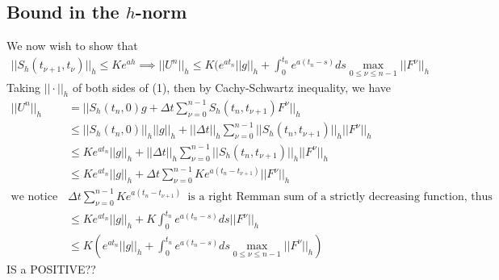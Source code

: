 \subsection{Bound in the $h$-norm}
We now wish to show that 
\begin{align*}
||S_h(t_{\nu+1},t_{\nu})||_h \leq Ke^{ah} \implies ||U^n||_h \leq K(e^{at_n} ||g||_h + \int_0^{t_n} e^{a(t_n-s)} ds \max_{0\leq \nu \leq n-1} ||F^{\nu}||_h
\end{align*}
Taking $||\cdot ||_h$ of both sides of (1), then by Cachy-Schwartz inequality, we have
\begin{align*}
||U^n||_h &= ||S_h(t_n,0)g+\Delta t \sum_{\nu = 0}^{n-1} S_h(t_n , t_{\nu + 1}) F^{\nu} ||_h \\
&\leq ||S_h(t_n,0)||_h||g||_h+||\Delta t||_h \sum_{\nu = 0}^{n-1} ||S_h(t_n , t_{\nu + 1})||_h || F^{\nu} ||_h \\
&\leq Ke^{at_n}||g||_h+||\Delta t||_h \sum_{\nu = 0}^{n-1} ||S_h(t_n , t_{\nu + 1})||_h || F^{\nu} ||_h\\
&\leq Ke^{at_n}||g||_h+\Delta t \sum_{\nu = 0}^{n-1} Ke^{a(t_n - t_{\nu+1})} || F^{\nu} ||_h\\ 
\text{we notice that} \enspace & \Delta t \sum_{\nu = 0}^{n-1} Ke^{a(t_n - t_{\nu+1})} \enspace \text{is a right Remman sum of a strictly decreasing function, thus} \\
&\leq Ke^{at_n}||g||_h+ K\int_0^{t_n} e^{a(t_n - s)} ds || F^{\nu} ||_h\\ 
&\leq K(e^{at_n}||g||_h+ \int_0^{t_n} e^{a(t_n - s)} ds \max_{0\leq \nu \leq n-1} ||F^{\nu}||_h)
\end{align*}
IS a POSITIVE??